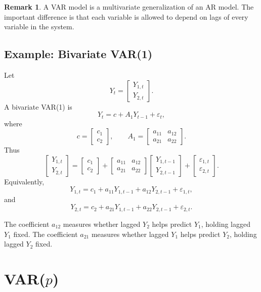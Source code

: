 \documentclass[12pt,oneside]{book}
\numberwithin{equation}{section}
\theoremstyle{definition}
\newtheorem{remark}{Remark}[section]
\theoremstyle{plain}
\theoremstyle{remark}
\begin{document}
\begin{remark}
A VAR model is a multivariate generalization of an AR model. The important difference is that each variable is allowed to depend on lags of every variable in the system.
\end{remark}

\subsection{Example: Bivariate VAR(1)}

Let
\[
Y_t=
\begin{bmatrix}
Y_{1,t}\\
Y_{2,t}
\end{bmatrix}.
\]
A bivariate VAR(1) is
\[
Y_t=c+A_1Y_{t-1}+\varepsilon_t,
\]
where
\[
c=
\begin{bmatrix}
c_1\\
c_2
\end{bmatrix},
\qquad
A_1=
\begin{bmatrix}
a_{11} & a_{12}\\
a_{21} & a_{22}
\end{bmatrix}.
\]
Thus
\[
\begin{bmatrix}
Y_{1,t}\\
Y_{2,t}
\end{bmatrix}
=
\begin{bmatrix}
c_1\\
c_2
\end{bmatrix}
+
\begin{bmatrix}
a_{11} & a_{12}\\
a_{21} & a_{22}
\end{bmatrix}
\begin{bmatrix}
Y_{1,t-1}\\
Y_{2,t-1}
\end{bmatrix}
+
\begin{bmatrix}
\varepsilon_{1,t}\\
\varepsilon_{2,t}
\end{bmatrix}.
\]
Equivalently,
\[
Y_{1,t}
=
c_1+a_{11}Y_{1,t-1}+a_{12}Y_{2,t-1}+\varepsilon_{1,t},
\]
and
\[
Y_{2,t}
=
c_2+a_{21}Y_{1,t-1}+a_{22}Y_{2,t-1}+\varepsilon_{2,t}.
\]

The coefficient $a_{12}$ measures whether lagged $Y_2$ helps predict $Y_1$, holding lagged $Y_1$ fixed. The coefficient $a_{21}$ measures whether lagged $Y_1$ helps predict $Y_2$, holding lagged $Y_2$ fixed.

\section{VAR($p$)}
\end{document}
